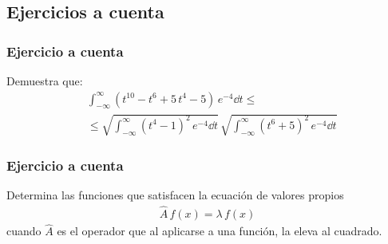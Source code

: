 \subsection{Ejercicios a cuenta}
\begin{frame}
\frametitle{Ejercicio a cuenta}
Demuestra que:
\begin{align*}
&\int_{-\infty}^{\infty} \left( t^{10} - t^{6} + 5 \, t^{4} - 5 \right) \, e^{-4} \dd{t} \leq \\
&\leq \sqrt{\int_{-\infty}^{\infty} \left( t^{4} - 1 \right)^{2} \, e^{-4} \dd{t}} \, \sqrt{\int_{-\infty}^{\infty} \left( t^{6} + 5 \right)^{2} \, e^{-4} \dd{t}}
\end{align*}
\end{frame}
\begin{frame}
\frametitle{Ejercicio a cuenta}
Determina las funciones que satisfacen la ecuación de valores propios
\begin{align*}
\hat{A} \, f(x) = \lambda \, f(x)
\end{align*}
cuando $\hat{A}$ es el operador que al aplicarse a una función, la eleva al cuadrado.
\end{frame}
